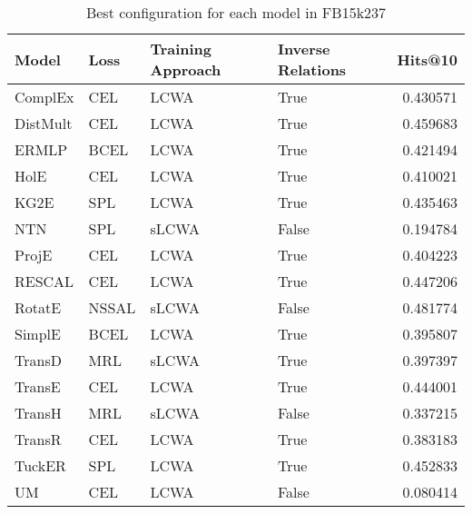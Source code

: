 \begin{table}
\centering
\caption{Best configuration for each model in FB15k237}
\label{best_models_fb15k237}
\begin{tabular}{llllr}
\toprule
    Model &   Loss & Training Approach & Inverse Relations &   Hits@10 \\
\midrule
  ComplEx &    CEL &              LCWA &              True &  0.430571 \\
 DistMult &    CEL &              LCWA &              True &  0.459683 \\
    ERMLP &   BCEL &              LCWA &              True &  0.421494 \\
     HolE &    CEL &              LCWA &              True &  0.410021 \\
     KG2E &    SPL &              LCWA &              True &  0.435463 \\
      NTN &    SPL &             sLCWA &             False &  0.194784 \\
    ProjE &    CEL &              LCWA &              True &  0.404223 \\
   RESCAL &    CEL &              LCWA &              True &  0.447206 \\
   RotatE &  NSSAL &             sLCWA &             False &  0.481774 \\
   SimplE &   BCEL &              LCWA &              True &  0.395807 \\
   TransD &    MRL &             sLCWA &              True &  0.397397 \\
   TransE &    CEL &              LCWA &              True &  0.444001 \\
   TransH &    MRL &             sLCWA &             False &  0.337215 \\
   TransR &    CEL &              LCWA &              True &  0.383183 \\
   TuckER &    SPL &              LCWA &              True &  0.452833 \\
       UM &    CEL &              LCWA &             False &  0.080414 \\
\bottomrule
\end{tabular}
\end{table}

